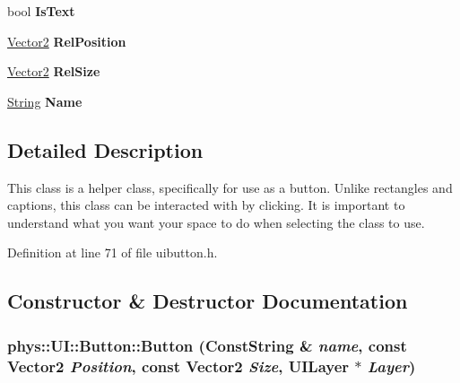\begin{DoxyCompactItemize}
\item 
\hypertarget{classphys_1_1UI_1_1Button_afaff4bcc222cba6beeefdaf3c4da4a22}{
bool {\bfseries IsText}}
\label{d8/d88/classphys_1_1UI_1_1Button_afaff4bcc222cba6beeefdaf3c4da4a22}

\item 
\hypertarget{classphys_1_1UI_1_1Button_a981baa14d909cd6750553e3802545380}{
\hyperlink{classphys_1_1Vector2}{Vector2} {\bfseries RelPosition}}
\label{d8/d88/classphys_1_1UI_1_1Button_a981baa14d909cd6750553e3802545380}

\item 
\hypertarget{classphys_1_1UI_1_1Button_a413a4e4c3b815275051a881b7539a8f9}{
\hyperlink{classphys_1_1Vector2}{Vector2} {\bfseries RelSize}}
\label{d8/d88/classphys_1_1UI_1_1Button_a413a4e4c3b815275051a881b7539a8f9}

\item 
\hypertarget{classphys_1_1UI_1_1Button_ab3151f18855c8de2ffb80975f04041c1}{
\hyperlink{namespacephys_aa03900411993de7fbfec4789bc1d392e}{String} {\bfseries Name}}
\label{d8/d88/classphys_1_1UI_1_1Button_ab3151f18855c8de2ffb80975f04041c1}

\end{DoxyCompactItemize}


\subsection{Detailed Description}
This class is a helper class, specifically for use as a button. Unlike rectangles and captions, this class can be interacted with by clicking. It is important to understand what you want your space to do when selecting the class to use. 

Definition at line 71 of file uibutton.h.



\subsection{Constructor \& Destructor Documentation}
\hypertarget{classphys_1_1UI_1_1Button_a3a6c635f427093a5e4247611e3120948}{
\subsubsection[{Button}]{\setlength{\rightskip}{0pt plus 5cm}phys::UI::Button::Button ({\bf ConstString} \& {\em name}, \/  const {\bf Vector2} {\em Position}, \/  const {\bf Vector2} {\em Size}, \/  {\bf UILayer} $\ast$ {\em Layer})}}
\label{d8/d88/classphys_1_1UI_1_1Button_a3a6c635f427093a5e4247611e3120948}


